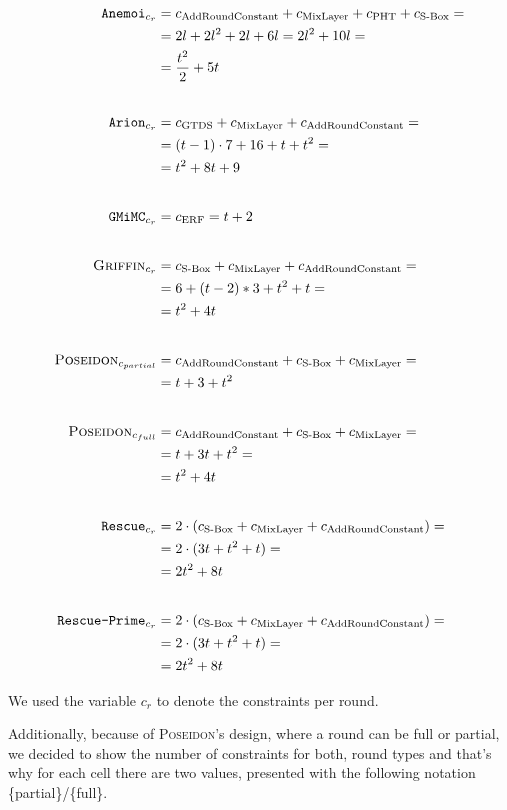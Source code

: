 \documentclass[12pt, a4paper]{report}
\begin{document}
\begin{align*}
  \texttt{Anemoi}_{c_r} & = c_{\text{AddRoundConstant}} + c_{\text{MixLayer}} + c_{\text{PHT}} + c_{\text{S-Box}} =\\
    &= 2l + 2l^2 + 2l + 6l = 2l^2 + 10l =\\
    &= \frac{t^2}{2} + 5t\\[20pt]
  \texttt{Arion}_{c_r} &= c_{\text{GTDS}} + c_{\text{MixLayer}} + c_{\text{AddRoundConstant}} =\\
    &= (t-1) \cdot 7 + 16 + t + t^2 =\\
    &= t^2 + 8t + 9\\[20pt]
  \texttt{GMiMC}_{c_r} &= c_{\text{ERF}} = t+2\\[20pt]
  \textsc{Griffin}_{c_r} &= c_{\text{S-Box}} + c_{\text{MixLayer}} + c_{\text{AddRoundConstant}} =\\
    & = 6 + (t-2)*3 + t^2 + t =\\
    & = t^2 + 4t\\[20pt]
  \textsc{Poseidon}_{c_{partial}} &= c_{\text{AddRoundConstant}} + c_{\text{S-Box}} + c_{\text{MixLayer}} =\\
    &= t + 3 + t^2\\[20pt]
  \textsc{Poseidon}_{c_{full}} &= c_{\text{AddRoundConstant}} + c_{\text{S-Box}} + c_{\text{MixLayer}} =\\ 
    &= t + 3t + t^2 =\\
    &= t^2 + 4t\\[20pt]
  \texttt{Rescue}_{c_r} &= 2 \cdot (c_{\text{S-Box}} + c_{\text{MixLayer}} + c_{\text{AddRoundConstant}}) =\\
    &= 2 \cdot (3t + t^2 + t) =\\
    &= 2t^2 + 8t\\[20pt]
  \texttt{Rescue-Prime}_{c_r} &= 2 \cdot (c_{\text{S-Box}} + c_{\text{MixLayer}} + c_{\text{AddRoundConstant}}) =\\
    &= 2 \cdot (3t + t^2 + t) =\\
    &= 2t^2 + 8t
\end{align*}

We used the variable $c_r$ to denote the constraints per round.

Additionally, because of \textsc{Poseidon}'s design, where a round can be full or partial, we decided to show the number of constraints for both, round types and that's why for each cell there are two values, presented with the following notation \{partial\}/\{full\}.
\end{document}
